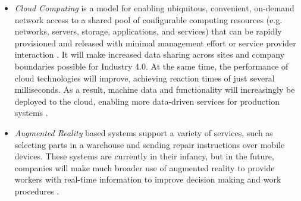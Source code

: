 \begin{itemize}
	\item \textit{Cloud Computing} is a model for enabling ubiquitous, convenient, on-demand network access to a shared pool of configurable computing resources (e.g. networks, servers, storage, applications, and services) that can be rapidly provisioned and released with minimal management effort or service provider interaction \cite{MELLNIST}. It will make increased data sharing across sites and company boundaries possible for Industry 4.0. At the same time, the performance of cloud technologies will improve, achieving reaction times of just several milliseconds. As a result, machine data and functionality will increasingly be deployed to the cloud, enabling more data-driven services for production systems \cite{IN4BCG,IN4DESIGN}.
	\item \textit{Augmented Reality} based systems support a variety of services, such as selecting parts in a warehouse and sending repair instructions over mobile devices. These systems are currently in their infancy, but in the future, companies will make much broader use of augmented reality to provide workers with real-time information to improve decision making and work procedures \cite{IN4BCG}.
\end{itemize}
